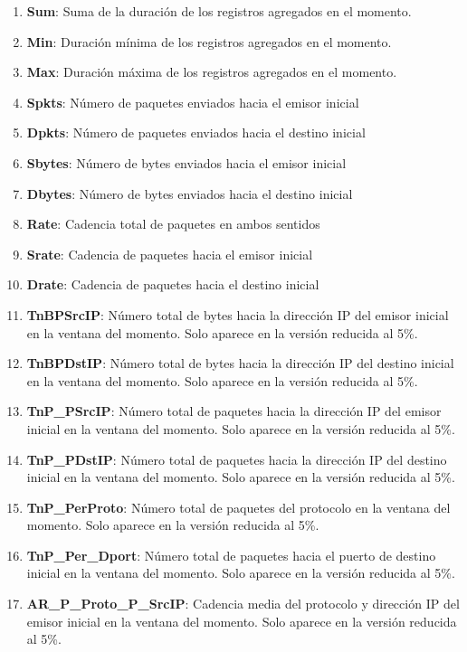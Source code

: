 \begin{enumerate}
    \item \textbf{Sum}: Suma de la duración de los registros agregados en el momento.
    \item \textbf{Min}: Duración mínima de los registros agregados en el momento.
    \item \textbf{Max}: Duración máxima de los registros agregados en el momento.
    \item \textbf{Spkts}: Número de paquetes enviados hacia el emisor inicial
    \item \textbf{Dpkts}: Número de paquetes enviados hacia el destino inicial
    \item \textbf{Sbytes}: Número de bytes enviados hacia el emisor inicial
    \item \textbf{Dbytes}: Número de bytes enviados hacia el destino inicial
    \item \textbf{Rate}: Cadencia total de paquetes en ambos sentidos
    \item \textbf{Srate}: Cadencia de paquetes hacia el emisor inicial
    \item \textbf{Drate}: Cadencia de paquetes hacia el destino inicial
    \item \textbf{TnBPSrcIP}: Número total de bytes hacia la dirección IP del emisor inicial en la ventana del momento. Solo aparece en la versión reducida al 5\%.
    \item \textbf{TnBPDstIP}: Número total de bytes hacia la dirección IP del destino inicial en la ventana del momento. Solo aparece en la versión reducida al 5\%.
    \item \textbf{TnP\_PSrcIP}: Número total de paquetes hacia la dirección IP del emisor inicial en la ventana del momento. Solo aparece en la versión reducida al 5\%.
    \item \textbf{TnP\_PDstIP}: Número total de paquetes hacia la dirección IP del destino inicial en la ventana del momento. Solo aparece en la versión reducida al 5\%.
    \item \textbf{TnP\_PerProto}: Número total de paquetes del protocolo en la ventana del momento. Solo aparece en la versión reducida al 5\%.
    \item \textbf{TnP\_Per\_Dport}: Número total de paquetes hacia el puerto de destino inicial en la ventana del momento. Solo aparece en la versión reducida al 5\%.
    \item \textbf{AR\_P\_Proto\_P\_SrcIP}: Cadencia media del protocolo y dirección IP del emisor inicial en la ventana del momento. Solo aparece en la versión reducida al 5\%.

\end{enumerate}
